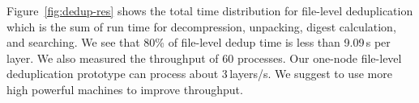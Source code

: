 Figure~\ref{fig:dedup-res} shows the total time distribution for
file-level deduplication which is the sum of run time for decompression, unpacking,
digest calculation, and searching. 
%
We see that 80\% of file-level dedup time is
less than 9.09\,s per layer.
%
%
We also measured the throughput of 60 processes. 
%
Our one-node file-level
deduplication prototype can process about 3\,layers/s. 
%
We suggest to use more
high powerful machines to improve throughput.

%
